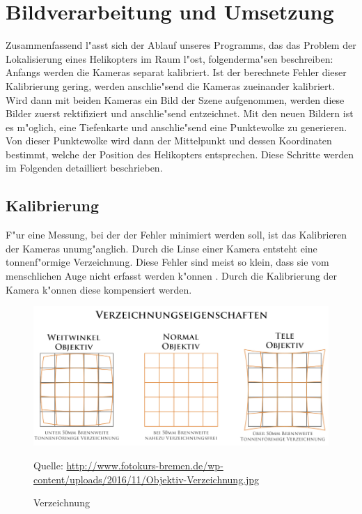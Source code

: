 \chapter{Bildverarbeitung und Umsetzung}
\label{cha:verarbeitungumsetzung}

Zusammenfassend l"asst sich der Ablauf unseres Programms,
das das Problem der Lokalisierung eines Helikopters im Raum l"ost, folgenderma"sen beschreiben:\newline
Anfangs werden die Kameras separat kalibriert. Ist der berechnete Fehler dieser Kalibrierung gering, werden anschlie"send die Kameras zueinander kalibriert. Wird dann mit beiden Kameras ein Bild der Szene aufgenommen, werden diese Bilder zuerst rektifiziert und anschlie"send entzeichnet. Mit den neuen Bildern ist es m"oglich, eine Tiefenkarte und anschlie"send eine Punktewolke zu generieren. Von dieser Punktewolke wird dann der Mittelpunkt und dessen Koordinaten bestimmt, welche der Position des Helikopters entsprechen.\newline
Diese Schritte werden im Folgenden detailliert beschrieben.

\section{Kalibrierung}
\label{sec:kalibrierung}

F"ur eine Messung, bei der der Fehler minimiert werden soll, ist das Kalibrieren der Kameras unumg"anglich. Durch die Linse einer Kamera entsteht eine tonnenf"ormige Verzeichnung. Diese Fehler sind meist so klein, dass sie vom menschlichen Auge nicht erfasst werden k"onnen \cite{VZ} \cite{VZ1}. Durch die Kalibrierung der Kamera k"onnen diese kompensiert werden.\newline

\begin{figure}[H]
	\includegraphics[scale=0.45]{bilder/verzeichnung}
	\caption[Verzeichnung]{Verzeichnung}
	\label{fig:verzeichnung}
	\small Quelle: \url{http://www.fotokurs-bremen.de/wp-content/uploads/2016/11/Objektiv-Verzeichnung.jpg}
\end{figure}

